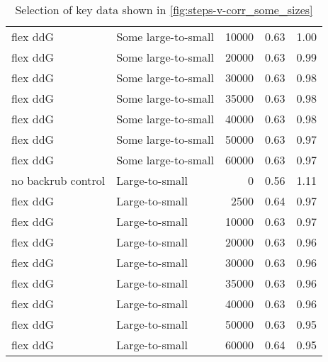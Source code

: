 \begin{table}
\begin{tabular}{llrrr}
           flex ddG &         Some large-to-small &         10000 & 0.63 & 1.00 \\
           flex ddG &         Some large-to-small &         20000 & 0.63 & 0.99 \\
           flex ddG &         Some large-to-small &         30000 & 0.63 & 0.98 \\
           flex ddG &         Some large-to-small &         35000 & 0.63 & 0.98 \\
           flex ddG &         Some large-to-small &         40000 & 0.63 & 0.98 \\
           flex ddG &         Some large-to-small &         50000 & 0.63 & 0.97 \\
           flex ddG &         Some large-to-small &         60000 & 0.63 & 0.97 \\
 no backrub control &              Large-to-small &             0 & 0.56 & 1.11 \\
           flex ddG &              Large-to-small &          2500 & 0.64 & 0.97 \\
           flex ddG &              Large-to-small &         10000 & 0.63 & 0.97 \\
           flex ddG &              Large-to-small &         20000 & 0.63 & 0.96 \\
           flex ddG &              Large-to-small &         30000 & 0.63 & 0.96 \\
           flex ddG &              Large-to-small &         35000 & 0.63 & 0.96 \\
           flex ddG &              Large-to-small &         40000 & 0.63 & 0.96 \\
           flex ddG &              Large-to-small &         50000 & 0.63 & 0.95 \\
           flex ddG &              Large-to-small &         60000 & 0.64 & 0.95 \\
\bottomrule
\end{tabular}

\caption[]{Selection of key data shown in \cref{fig:steps-v-corr_some_sizes}}
\label{tab:steps-v-corr_some_sizes-underlying-data}
\end{table}
